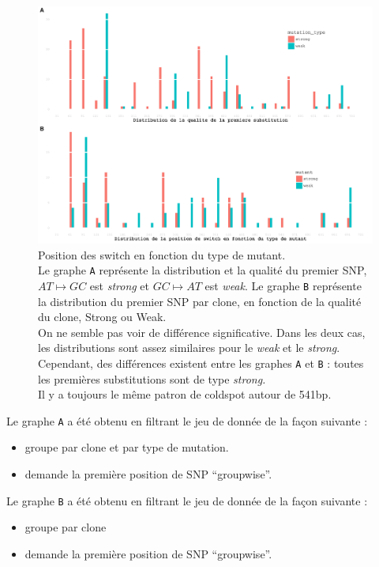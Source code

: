 \documentclass[a4paper]{tufte-handout}
\begin{document}
\begin{figure}
  \includegraphics[width=\linewidth]{../switch_pos_by_mutant.pdf}
  \caption{Position des switch en fonction du type de mutant. \\
    Le graphe \texttt{A} représente la distribution et la qualité du premier
    SNP, $AT \mapsto GC$ est \emph{strong} et $GC \mapsto AT$ est \emph{weak}.
    Le graphe \texttt{B} représente la distribution du premier SNP par clone, en
    fonction de la qualité du clone, Strong ou Weak. \\
    On ne semble pas voir de différence significative. Dans les deux cas, les
    distributions sont assez similaires pour le \emph{weak} et le \emph{strong}.
    Cependant, des différences existent entre les graphes \texttt{A} et
    \texttt{B} : toutes les premières substitutions sont de type
    \emph{strong.} \\
    Il y a toujours le même patron de coldspot autour de 541bp.}
\end{figure}

Le graphe \texttt{A} a été obtenu en filtrant le jeu de donnée de la façon suivante : 
\begin{itemize}
\item groupe par clone et par type de mutation.
\item demande la première position de SNP ``groupwise''.
\end{itemize}

Le graphe \texttt{B} a été obtenu en filtrant le jeu de donnée de la façon suivante :
\begin{itemize}
\item groupe par clone
\item demande la première position de SNP ``groupwise''.
\end{itemize}
\end{document}
